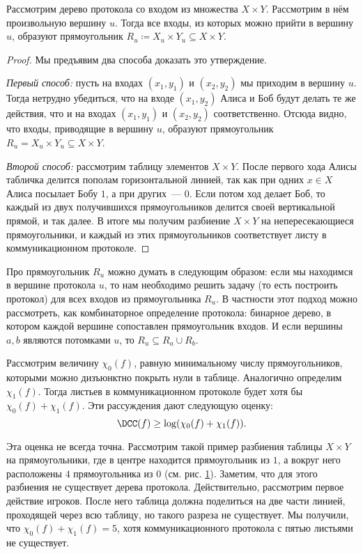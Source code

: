 \begin{proposition} 
    Рассмотрим дерево протокола со входом из множества $X \times Y$. Рассмотрим в нём произвольную
    вершину $u$. Тогда все входы, из которых можно прийти в вершину $u$, образуют прямоугольник
    $R_u \coloneqq X_u \times Y_u \subseteq X \times Y$.
\end{proposition}

\begin{proof}
    Мы предъявим два способа доказать это утверждение.
    
    \textit{Первый способ:} пусть на входах $(x_1, y_1)$ и $(x_2, y_2)$ мы приходим в вершину $u$. Тогда
    нетрудно убедиться, что на входе $(x_1, y_2)$ Алиса и Боб будут делать те же действия, что и на входах
    $(x_1, y_1)$ и $(x_2, y_2)$ соответственно. Отсюда видно, что входы, приводящие в вершину $u$,
    образуют прямоугольник $R_u = X_u \times Y_u \subseteq X \times Y$. 
    
    \textit{Второй способ:} рассмотрим таблицу элементов $X \times Y$. После первого хода Алисы табличка
    делится пополам горизонтальной линией, так как при одних $x \in X$ Алиса посылает Бобу $1$, а при
    других~--- $0$. Если потом ход делает Боб, то каждый из двух получившихся прямоугольников делится
    своей вертикальной прямой, и так далее. В итоге мы получим разбиение $X \times Y$ на непересекающиеся
    прямоугольники, и каждый из этих прямоугольников соответствует листу в коммуникационном протоколе.  
\end{proof}


Про прямоугольник $R_u$ можно думать в следующим образом: если мы находимся в вершине протокола $u$, то
нам необходимо решить задачу (то есть построить протокол) для всех входов из прямоугольника $R_u$. В
частности этот подход можно рассмотреть, как комбинаторное определение протокола: бинарное дерево, в
котором каждой вершине сопоставлен прямоугольник входов. И если вершины $a, b$ являются потомками $u$, то
$R_u \subseteq R_a \cup R_b$.

Рассмотрим величину $\chi_0(f)$, равную минимальному числу прямоугольников, которыми можно дизъюнктно
покрыть нули в таблице. Аналогично определим $\chi_1(f)$. Тогда листьев в коммуникационном протоколе
будет хотя бы $\chi_0(f) + \chi_1(f)$. Эти рассуждения дают следующую оценку:
$$
    \DCC(f) \ge \log(\chi_0(f) + \chi_1(f)).
$$

Эта оценка не всегда точна. Рассмотрим такой пример разбиения таблицы $X \times Y$ на прямоугольники, где в
центре находится прямоугольник из $1$, а вокруг него расположены $4$ прямоугольника из $0$
(см. рис. \ref{fig:partition-rect}). Заметим, что для этого разбиения не существует дерева
протокола. Действительно, рассмотрим первое действие игроков. После него таблица должна поделиться на две
части линией, проходящей через всю таблицу, но такого разреза не существует. Мы получили, что $\chi_0(f)
+ \chi_1(f) = 5$, хотя коммуникационного протокола с пятью листьями не существует.
\begin{figure}[h]
 	\centering
    
 	\caption{}
 	\label{fig:partition-rect}
\end{figure}
	

